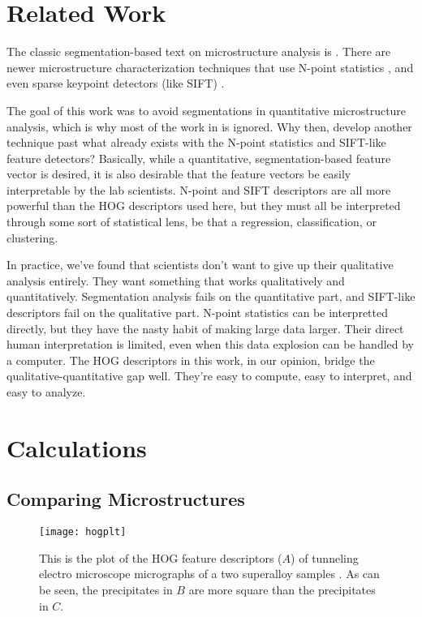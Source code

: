 \documentclass[review]{elsarticle}
\begin{document}
	\section{Related Work}
	The classic segmentation-based text on microstructure analysis is \cite{underwood}. There are newer microstructure characterization techniques that use N-point statistics \cite{kalidindi1, kalidindi2}, and even sparse keypoint detectors (like SIFT) \cite{decost}.

	The goal of this work was to avoid segmentations in quantitative microstructure analysis, which is why most of the work in \cite{underwood} is ignored. Why then, develop another technique past what already exists with the N-point statistics and SIFT-like feature detectors? Basically, while a quantitative, segmentation-based feature vector is desired, it is also desirable that the feature vectors be easily interpretable by the lab scientists. N-point and SIFT descriptors are all more powerful than the HOG descriptors used here, but they must all be interpreted through some sort of statistical lens, be that a regression, classification, or clustering.
	
	In practice, we've found that scientists don't want to give up their qualitative analysis entirely. They want something that works qualitatively and quantitatively. Segmentation analysis fails on the quantitative part, and SIFT-like descriptors fail on the qualitative part. N-point statistics can be interpretted directly, but they have the nasty habit of making large data larger. Their direct human interpretation is limited, even when this data explosion can be handled by a computer. The HOG descriptors in this work, in our opinion, bridge the qualitative-quantitative gap well. They're easy to compute, easy to interpret, and easy to analyze.

	\section{Calculations}
	\subsection{Comparing Microstructures}
	\begin{figure}[!ht]
  		\centering
    	\texttt{[image: hogplt]}
  		\caption{ This is the plot of the HOG feature descriptors ($A$) of tunneling electro microscope micrographs of a two superalloy samples \cite{molly}. As can be seen, the precipitates in $B$ are more square than the precipitates in $C$. }
  		\label{figure2}
	\end{figure}
\end{document}
